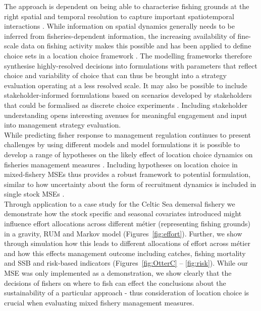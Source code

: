 \documentclass[12pt, halfline, a4paper]{ouparticle}
\begin{document}
The approach is dependent on being able to characterise fishing grounds at the
right spatial and temporal resolution to capture important spatiotemporal
interactions \citep{Dolder2020a}. While information on spatial dynamics
generally needs to be inferred from fisheries-dependent information, the
increasing availability of fine-scale data on fishing activity makes this
possible \citep{Gerritsen2012, Mateo2016} and has been applied to define choice
sets in a location choice framework \citep{Hynes2016}. The modelling frameworks therefore synthesise highly-resolved decisions into formulations with parameters that reflect choice and variability of choice that can thus be brought into a strategy evaluation operating at a less resolved scale. It may also be possible to include stakeholder-informed formulations based on scenarios developed by stakeholders that could be formalised as discrete choice experiments \citep{johnson2013constructing}. Including stakeholder understanding opens interesting avenues for meaningful engagement and input into management strategy evaluation.\\ 

While predicting fisher response to management regulation continues to present
challenges \citep{Andersen2010a} by using different models and model
formulations it is possible to develop a range of hypotheses on the likely
effect of location choice dynamics on fisheries management measures
\citep[][\textit{in prep}]{Dolder2020}. Including hypotheses on
location choice in mixed-fishery MSEs thus provides a robust framework to potential
formulation, similar to how uncertainty about the form of recruitment dynamics
is included in single stock MSEs \citep[e.g.][]{ICES2020}.  \\

Through application to a case study for the Celtic Sea demersal fishery we
demonstrate how the stock specific and seasonal covariates introduced might
influence effort allocations across different métier (representing fishing
grounds) in a gravity, RUM and Markov model (Figures~\ref{fig:effort}). Further, we show through
simulation how this leads to different allocations of effort across métier
and how this effects management outcome including catches, fishing mortality
and SSB and risk-based indicators (Figures~\ref{fig:OtterC} -- \ref{fig:risk}). While our MSE was only implemented as a
demonstration, we show clearly that the decisions of fishers on where to fish
can effect the conclusions about the sustainability of a particular approach -
thus consideration of location choice is crucial when evaluating mixed fishery
management measures. \\
\end{document}
